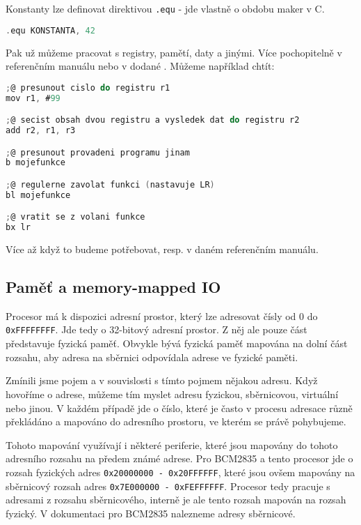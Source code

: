 \documentclass{article}
\begin{document}
Konstanty lze definovat direktivou \texttt{.equ} - jde vlastně o obdobu maker v C.

\begin{lstlisting}[language=C]
.equ KONSTANTA, 42
\end{lstlisting}

Pak už můžeme pracovat s registry, pamětí, daty a jinými. Více pochopitelně v referenčním manuálu nebo v dodané . Můžeme například chtít:

\begin{lstlisting}[language=C]
;@ presunout cislo do registru r1
mov r1, #99

;@ secist obsah dvou registru a vysledek dat do registru r2
add r2, r1, r3

;@ presunout provadeni programu jinam
b mojefunkce

;@ regulerne zavolat funkci (nastavuje LR)
bl mojefunkce

;@ vratit se z volani funkce
bx lr
\end{lstlisting}

Více až když to budeme potřebovat, resp. v daném referenčním manuálu.

\subsection{Paměť a memory-mapped IO}

Procesor má k dispozici adresní prostor, který lze adresovat čísly od 0 do \texttt{0xFFFFFFFF}. Jde tedy o 32-bitový adresní prostor. Z něj ale pouze část představuje fyzická paměť. Obvykle bývá fyzická paměť mapována na dolní část rozsahu, aby adresa na sběrnici odpovídala adrese ve fyzické paměti.

Zmínili jsme pojem  a v souvislosti s tímto pojmem nějakou adresu. Když hovoříme o adrese, můžeme tím myslet adresu fyzickou, sběrnicovou, virtuální nebo jinou. V každém případě jde o číslo, které je často v procesu adresace různě překládáno a mapováno do adresního prostoru, ve kterém se právě pohybujeme.

Tohoto mapování využívají i některé periferie, které jsou mapovány do tohoto adresního rozsahu na předem známé adrese. Pro BCM2835 a tento procesor jde o rozsah fyzických adres \texttt{0x20000000 - 0x20FFFFFF}, které jsou ovšem mapovány na sběrnicový rozsah adres \texttt{0x7E000000 - 0xFEFFFFFF}. Procesor tedy pracuje s adresami z rozsahu sběrnicového, interně je ale tento rozsah mapován na rozsah fyzický. V dokumentaci pro BCM2835 nalezneme adresy sběrnicové.
\end{document}
